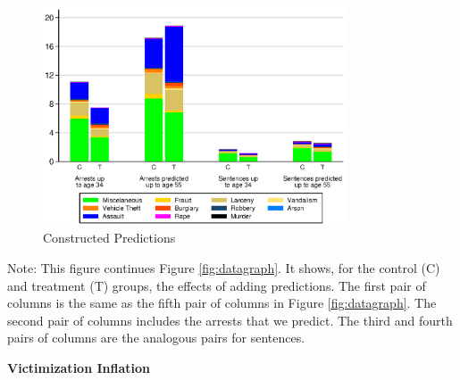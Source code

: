 \documentclass[static]{JJH-Beamer}
\begin{document}
\begin{frame}
 \addtocounter{framenumber}{-1}

\begin{figure}[H]
\caption{Constructed Predictions}\label{fig:predictions}
\begin{center}
\includegraphics[width=0.8\textwidth]{AppOutput/Crime/predictions}
\end{center}
\end{figure}

\end{frame}

{\flushleft \normalsize Note: This figure continues Figure \ref{fig:datagraph}. It shows, for the control (C) and treatment (T) groups, the effects of adding predictions. The first pair of columns is the same as the fifth pair of columns in Figure \ref{fig:datagraph}. The second pair of columns includes the arrests that we predict. The third and fourth pairs of columns are the analogous pairs for sentences.\\}

\clearpage
\begin{frame}
 \addtocounter{framenumber}{-1}

\begin{center}
\textbf{Victimization Inflation}
\end{center}

\end{frame}
\end{document}
